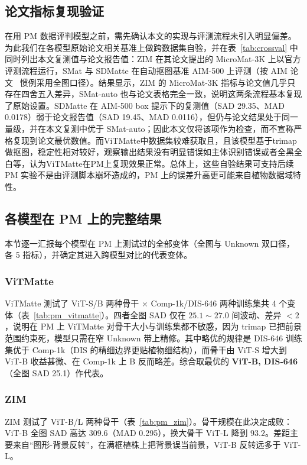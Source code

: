 \documentclass[supercite]{HustGraduPaper}
\begin{document}
	\subsection{论文指标复现验证}\label{sec:crossval}
	在用 PM 数据评判模型之前，需先确认本文的实现与评测流程未引入明显偏差。为此我们在各模型原始论文相关基准上做跨数据集自验，并在表~\ref{tab:crossval} 中同时列出本文复测值与论文报告值：ZIM 在其论文提出的 MicroMat-3K 上以官方评测流程运行，SMat 与 SDMatte 在自动抠图基准 AIM-500 上评测（按 AIM 论文~\cite{AIM} 惯例采用全图口径）。结果显示，ZIM 的 MicroMat-3K 指标与论文值几乎只存在四舍五入差异，SMat-auto 也与论文表格完全一致，说明这两条流程基本复现了原始设置。SDMatte 在 AIM-500 box 提示下的复测值（SAD 29.35、MAD 0.0178）弱于论文报告值（SAD 19.45、MAD 0.0116），但仍与论文结果处于同一量级，并在本文复测中优于 SMat-auto；因此本文仅将该项作为检查，而不宣称严格复现到论文最优数值。而ViTMatte中数据集较难获取且，且该模型基于trimap做抠图，稳定性相对较好，观察输出结果没有明显错误如主体识别错误或者全黑全白等，认为ViTMatte在PM上复现效果正常。总体上，这些自验结果可支持后续 PM 实验不是由评测脚本崩坏造成的，PM 上的误差升高更可能来自植物数据域特性。

	

	\subsection{各模型在 PM 上的完整结果}\label{sec:permodel}
	本节逐一汇报每个模型在 PM 上测试过的全部变体（全图与 Unknown 双口径，各 5 指标），并确定其进入跨模型对比的代表变体。

	\subsubsection{ViTMatte}
	ViTMatte 测试了 ViT-S/B 两种骨干 $\times$ Comp-1k/DIS-646 两种训练集共 4 个变体（表~\ref{tab:pm_vitmatte}）。四者全图 SAD 仅在 $25.1\sim27.0$ 间波动、差异 $<2$，说明在 PM 上 ViTMatte 对骨干大小与训练集都不敏感，因为 trimap 已把前景范围约束死，模型只需在窄 Unknown 带上精修。其中略优的规律是 DIS-646 训练集优于 Comp-1k（DIS 的精细边界更贴植物细结构），而骨干由 ViT-S 增大到 ViT-B 收益甚微、在 Comp-1k 上 B 反而略差。综合取最优的 \textbf{ViT-B, DIS-646}（全图 SAD 25.1）作代表。

	

	\subsubsection{ZIM}
	ZIM 测试了 ViT-B/L 两种骨干（表~\ref{tab:pm_zim}）。骨干规模在此决定成败：ViT-B 全图 SAD 高达 $309.6$（MAD 0.295），换大骨干 ViT-L 降到 $93.2$。差距主要来自“图形-背景反转”，在满框植株上把背景误当前景，ViT-B 反转远多于 ViT-L。
\end{document}
